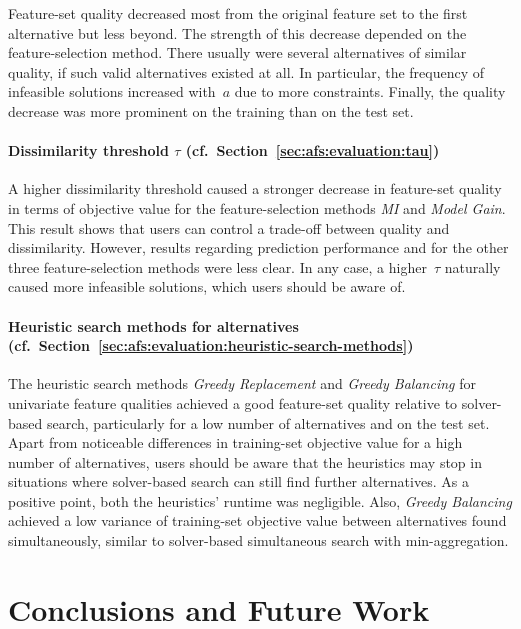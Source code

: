 \documentclass{article}
\theoremstyle{definition}
\begin{document}
Feature-set quality decreased most from the original feature set to the first alternative but less beyond.
The strength of this decrease depended on the feature-selection method.
There usually were several alternatives of similar quality, if such valid alternatives existed at all.
In particular, the frequency of infeasible solutions increased with~$a$ due to more constraints.
Finally, the quality decrease was more prominent on the training than on the test set.

\paragraph{Dissimilarity threshold $\tau$ (cf.~Section~\ref{sec:afs:evaluation:tau})}

A higher dissimilarity threshold caused a stronger decrease in feature-set quality in terms of objective value for the feature-selection methods \emph{MI} and \emph{Model Gain}.
This result shows that users can control a trade-off between quality and dissimilarity.
However, results regarding prediction performance and for the other three feature-selection methods were less clear.
In any case, a higher~$\tau$ naturally caused more infeasible solutions, which users should be aware of.

\paragraph{Heuristic search methods for alternatives (cf.~Section~\ref{sec:afs:evaluation:heuristic-search-methods})}

The heuristic search methods \emph{Greedy Replacement} and \emph{Greedy Balancing} for univariate feature qualities achieved a good feature-set quality relative to solver-based search, particularly for a low number of alternatives and on the test set.
Apart from noticeable differences in training-set objective value for a high number of alternatives, users should be aware that the heuristics may stop in situations where solver-based search can still find further alternatives.
As a positive point, both the heuristics' runtime was negligible.
Also, \emph{Greedy Balancing} achieved a low variance of training-set objective value between alternatives found simultaneously, similar to solver-based simultaneous search with min-aggregation.

\section{Conclusions and Future Work}
\label{sec:afs:conclusion}
\end{document}
